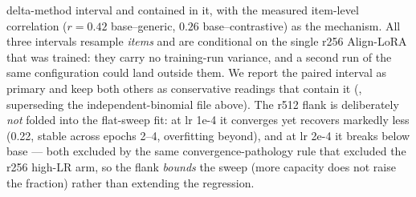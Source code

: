 \begin{table}[tbp]
\begin{threeparttable}
\begin{tablenotes}[flushleft]
delta-method interval and contained in it, with the measured item-level correlation
($r{=}0.42$ base--generic, $0.26$ base--contrastive) as the mechanism. All three
intervals resample \emph{items} and are conditional on the single r256 Align-LoRA
that was trained: they carry no training-run variance, and a second run of the same
configuration could land outside them. We report the
paired interval as primary and keep both others as conservative readings that contain
it (, superseding the independent-binomial
file above). The r512 flank
is deliberately \emph{not} folded into the flat-sweep fit: at lr 1e-4 it converges
yet recovers markedly less (0.22, stable across epochs 2--4, overfitting beyond),
and at lr 2e-4 it breaks below base --- both excluded by the same
convergence-pathology rule that excluded the r256 high-LR arm, so the flank
\emph{bounds} the sweep (more capacity does not raise the fraction) rather than
extending the regression.
\end{tablenotes}
\end{threeparttable}
\end{table}

